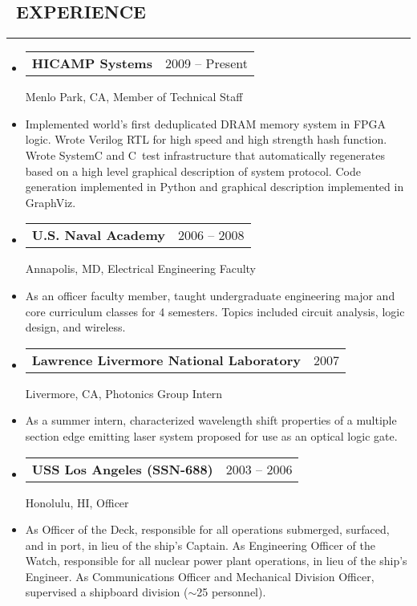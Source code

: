 \documentclass[10pt,letterpaper]{article}
\makeatletter
\newenvironment{changemargin}[2]
{%
    \begin{list}{}{%
        \setlength{\topsep}{0pt}%
        \setlength{\leftmargin}{#1}%
        \setlength{\rightmargin}{#2}%
        \setlength{\listparindent}{\parindent}%
        \setlength{\itemindent}{\parindent}%
        \setlength{\parsep}{\parskip}%
    }%
    \item[]
}%
{%
    \end{list}
}%
\newenvironment{content}
{%
    \begin{changemargin}{0cm}{2.5cm}
    \begin{itemize*}
        \vspace{-0.15em}
}%
{%
    \end{itemize*}
    \end{changemargin}
}%
\newenvironment{resumesection}[1]
{%
    \subsection*{\ #1}
    \vspace{-0.4em}
    \hrule
    \vspace{+0.4em}
    \begin{itemize}[leftmargin=0.15cm]
        \parskip=0.1em
}%
{%
    \end{itemize}
}%
\newcommand{\headerrowx}[2]
{\item[] \begin{tabular*}{\linewidth}{l@{\extracolsep{\fill}}r}
	#1 &
	#2 \\
\end{tabular*}}
\newcommand{\CPP}
{C\nolinebreak[4]\hspace{-.05em}\raisebox{.22ex}{\footnotesize\bf +\hspace{-.20em}+}\ }
\makeatother
\begin{document}
\begin{minipage}[t]{.55\textwidth}
\begin{resumesection}{EXPERIENCE}
    \headerrowx{ \textbf{HICAMP Systems}}{2009 -- Present}
    
    Menlo Park, CA, Member of Technical Staff
    \item[] Implemented world's first deduplicated DRAM memory system in FPGA logic.
            Wrote Verilog RTL for high speed and high strength hash function.
            Wrote SystemC and \CPP test infrastructure that automatically regenerates based on a high level graphical description of system protocol.
            Code generation implemented in Python and graphical description implemented in GraphViz.
    
    \headerrowx{ \textbf{U.S. Naval Academy}}{2006 -- 2008}
    
    Annapolis, MD, Electrical Engineering Faculty
    \item[] As an officer faculty member, taught undergraduate engineering major and core curriculum classes for 4 semesters.
            Topics included circuit analysis, logic design, and wireless.
    
    \headerrowx{ \textbf{Lawrence Livermore National Laboratory}}{2007}
    
    Livermore, CA, Photonics Group Intern
    \item[] As a summer intern, characterized wavelength shift properties of a multiple section edge emitting laser system proposed for use as an optical logic gate.
    
    \headerrowx{ \textbf{USS Los Angeles (SSN-688)}}{2003 -- 2006}
    
    Honolulu, HI, Officer
    \item[] As Officer of the Deck, responsible for all operations submerged, surfaced, and in port, in lieu of the ship's Captain.
            As Engineering Officer of the Watch, responsible for all nuclear power plant operations, in lieu of the ship's Engineer.
            As Communications Officer and Mechanical Division Officer, supervised a shipboard division ({\footnotesize{$\sim$}}25 personnel).
    

\end{resumesection}
\end{minipage}
\end{document}
